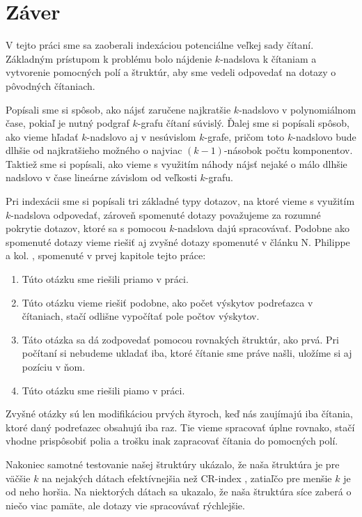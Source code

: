 \chapter*{Záver}

V tejto práci sme sa zaoberali indexáciou potenciálne veľkej sady
čítaní. Základným prístupom k problému bolo nájdenie $k$-nadslova
k čítaniam a vytvorenie pomocných polí a štruktúr, aby sme vedeli
odpovedať na dotazy o pôvodných čítaniach.

Popísali sme si spôsob, ako nájsť zaručene najkratšie $k$-nadslovo
v polynomiálnom čase, pokiaľ je nutný podgraf $k$-grafu čítaní
súvislý. Ďalej sme si popísali spôsob, ako vieme hľadať $k$-nadslovo
aj v nesúvislom $k$-grafe, pričom toto $k$-nadslovo bude dlhšie
od najkratšieho možného o najviac $(k-1)$-násobok počtu komponentov.
Taktiež sme si popísali, ako vieme s využitím náhody nájsť nejaké
o málo dlhšie nadslovo v čase lineárne závislom od veľkosti $k$-grafu.

Pri indexácii sme si popísali tri základné typy dotazov, na ktoré vieme
s využitím $k$-nadslova odpovedať, zároveň spomenuté dotazy považujeme
za rozumné pokrytie dotazov, ktoré sa s pomocou $k$-nadslova dajú spracovávať.
Podobne ako spomenuté dotazy vieme riešiť aj zvyšné dotazy spomenuté v
článku N. Philippe a kol. \cite{gk_arrays}, spomenuté v prvej kapitole
tejto práce:
\begin{enumerate}
    \item Túto otázku sme riešili priamo v práci.
    \item Túto otázku vieme riešiť podobne, ako počet výskytov podreťazca
          v čítaniach, stačí odlišne vypočítať pole počtov výskytov.
    \item Táto otázka sa dá zodpovedať pomocou rovnakých štruktúr, ako prvá.
          Pri počítaní si nebudeme ukladať iba, ktoré čítanie sme práve našli,
          uložíme si aj pozíciu v ňom.
    \item Túto otázku sme riešili piamo v práci.
\end{enumerate}

Zvyšné otázky sú len modifikáciou prvých štyroch, keď nás zaujímajú iba čítania,
ktoré daný podreťazec obsahujú iba raz. Tie vieme spracovať úplne rovnako, stačí
vhodne prispôsobiť polia a trošku inak zapracovať čítania do pomocných polí.

Nakoniec samotné testovanie našej štruktúry ukázalo, že naša štruktúra je pre
väčšie $k$ na nejakých dátach efektívnejšia než CR-index \cite{cr_index}, zatiaľčo pre menšie $k$
je od neho horšia. Na niektorých dátach sa ukazalo, že naša štruktúra síce zaberá
o niečo viac pamäte, ale dotazy vie spracovávať rýchlejšie.

